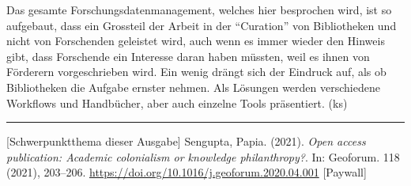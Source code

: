 \documentclass[a4paper,
fontsize=11pt,
oneside,
numbers=noperiodatend,
parskip=half-,
bibliography=totoc,
final
]{scrartcl}
\begin{document}
Das gesamte Forschungsdatenmanagement, welches hier besprochen wird, ist
so aufgebaut, dass ein Grossteil der Arbeit in der \enquote{Curation}
von Bibliotheken und nicht von Forschenden geleistet wird, auch wenn es
immer wieder den Hinweis gibt, dass Forschende ein Interesse daran haben
müssten, weil es ihnen von Förderern vorgeschrieben wird. Ein wenig
drängt sich der Eindruck auf, als ob Bibliotheken die Aufgabe ernster
nehmen. Als Lösungen werden verschiedene Workflows und Handbücher, aber
auch einzelne Tools präsentiert. (ks)

\begin{center}\rule{0.5\linewidth}{0.5pt}\end{center}

{[}Schwerpunktthema dieser Ausgabe{]} Sengupta, Papia. (2021).
\emph{Open access publication: Academic colonialism or knowledge
philanthropy?}. In: Geoforum. 118 (2021), 203--206.
\url{https://doi.org/10.1016/j.geoforum.2020.04.001} {[}Paywall{]}
\end{document}
